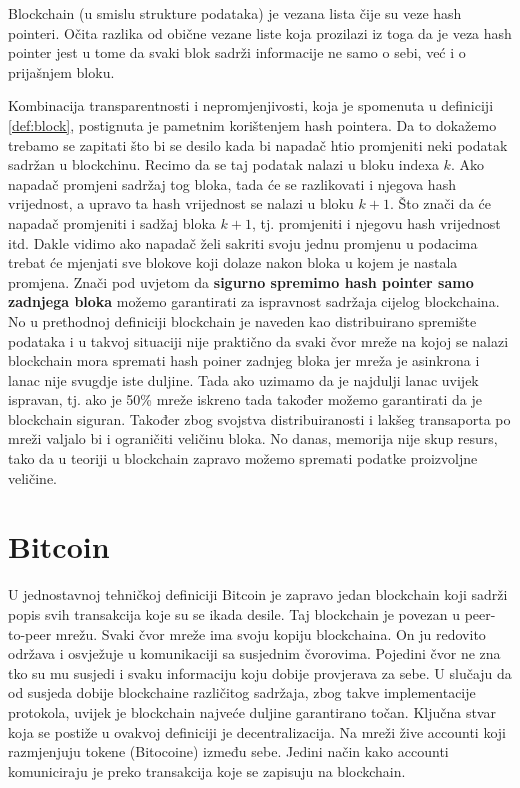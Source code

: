 \documentclass[12pt]{report}
\begin{document}
Blockchain (u smislu strukture podataka) je vezana lista čije su veze hash pointeri. Očita razlika od obične vezane liste koja prozilazi iz toga da je veza hash pointer jest u tome da svaki blok sadrži informacije ne samo o sebi, već i o prijašnjem bloku. 

Kombinacija transparentnosti i nepromjenjivosti, koja je spomenuta u definiciji \ref{def:block}, postignuta je pametnim korištenjem hash pointera. Da to dokažemo trebamo se zapitati što bi se desilo kada bi napadač htio promjeniti neki podatak sadržan u blockchinu. Recimo da se taj podatak nalazi u bloku indexa $k$. Ako napadač promjeni sadržaj tog bloka, tada će se razlikovati i njegova hash vrijednost, a upravo ta hash vrijednost se nalazi u bloku $k+1$. Što znači da će napadač promjeniti i sadžaj bloka $k+1$, tj. promjeniti i njegovu hash vrijednost itd. Dakle vidimo ako napadač želi sakriti svoju jednu promjenu u podacima trebat će mjenjati sve blokove koji dolaze nakon bloka u kojem je nastala promjena. Znači pod uvjetom da \textbf{sigurno spremimo hash pointer samo zadnjega bloka} možemo garantirati za ispravnost sadržaja cijelog blockchaina. No u prethodnoj definiciji blockchain je naveden kao distribuirano spremište podataka i u takvoj situaciji nije praktično da svaki čvor mreže na kojoj se nalazi blockchain mora spremati hash poiner zadnjeg bloka jer mreža je asinkrona i lanac nije svugdje iste duljine. Tada ako uzimamo da je najdulji lanac uvijek ispravan, tj. ako je 50\% mreže iskreno tada također možemo garantirati da je blockchain siguran. Također zbog svojstva distribuiranosti i lakšeg transaporta po mreži valjalo bi i ograničiti veličinu bloka. No danas, memorija nije skup resurs, tako da u teoriji u blockchain zapravo možemo spremati podatke proizvoljne veličine.

\section{Bitcoin}

U jednostavnoj tehničkoj definiciji Bitcoin je zapravo jedan blockchain koji sadrži popis svih transakcija koje su se ikada desile. Taj blockchain je povezan u peer-to-peer mrežu. Svaki čvor mreže ima svoju kopiju blockchaina. On ju redovito održava i osvježuje u komunikaciji sa susjednim čvorovima. Pojedini čvor ne zna tko su mu susjedi i svaku informaciju koju dobije provjerava za sebe. U slučaju da od susjeda dobije blockchaine različitog sadržaja, zbog takve implementacije protokola, uvijek je blockchain najveće duljine garantirano točan. Ključna stvar koja se postiže u ovakvoj definiciji je decentralizacija. Na mreži žive accounti koji razmjenjuju tokene (Bitocoine) između sebe. Jedini način kako accounti komuniciraju je preko transakcija koje se zapisuju na blockchain. 
\end{document}
